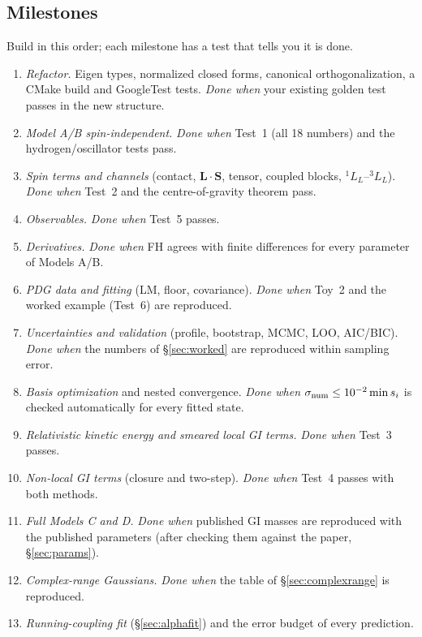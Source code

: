 \documentclass[11pt,a4paper]{article}
\numberwithin{equation}{section}
\theoremstyle{definition}
\theoremstyle{plain}
\theoremstyle{remark}
\numberwithin{algorithm}{section}
\newcommand{\vL}{\bm L}
\newcommand{\vS}{\bm S}
\begin{document}
\subsection{Milestones}\label{sec:bp-milestones}
Build in this order; each milestone has a test that tells you it is done.
\begin{enumerate}[leftmargin=2.2em,itemsep=2pt]
\item[M0] \emph{Refactor.} Eigen types, normalized closed forms, canonical orthogonalization, a CMake build and GoogleTest tests. \emph{Done when} your existing golden test passes in the new structure.
\item[M1] \emph{Model A/B spin-independent.} \emph{Done when} Test~1 (all 18 numbers) and the hydrogen/oscillator tests pass.
\item[M2] \emph{Spin terms and channels} (contact, $\vL\cdot\vS$, tensor, coupled blocks, ${}^1L_L$--${}^3L_L$). \emph{Done when} Test~2 and the centre-of-gravity theorem pass.
\item[M3] \emph{Observables.} \emph{Done when} Test~5 passes.
\item[M4] \emph{Derivatives.} \emph{Done when} FH agrees with finite differences for every parameter of Models A/B.
\item[M5] \emph{PDG data and fitting} (LM, floor, covariance). \emph{Done when} Toy~2 and the worked example (Test~6) are reproduced.
\item[M6] \emph{Uncertainties and validation} (profile, bootstrap, MCMC, LOO, AIC/BIC). \emph{Done when} the numbers of \S\ref{sec:worked} are reproduced within sampling error.
\item[M7] \emph{Basis optimization} and nested convergence. \emph{Done when} $\sigma_{\rm num}\le10^{-2}\min s_i$ is checked automatically for every fitted state.
\item[M8] \emph{Relativistic kinetic energy and smeared local GI terms.} \emph{Done when} Test~3 passes.
\item[M9] \emph{Non-local GI terms} (closure and two-step). \emph{Done when} Test~4 passes with both methods.
\item[M10] \emph{Full Models C and D.} \emph{Done when} published GI masses are reproduced with the published parameters (after checking them against the paper, \S\ref{sec:params}).
\item[M11] \emph{Complex-range Gaussians.} \emph{Done when} the table of \S\ref{sec:complexrange} is reproduced.
\item[M12] \emph{Running-coupling fit} (\S\ref{sec:alphafit}) and the error budget of every prediction.
\end{enumerate}
\end{document}
